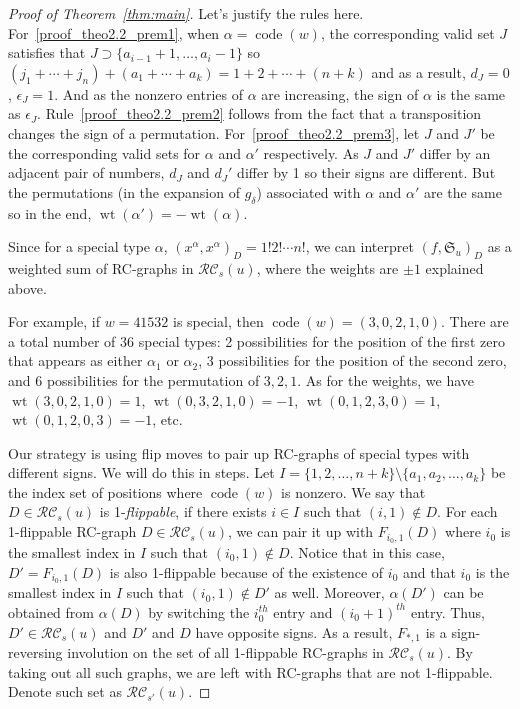 \documentclass[ALCO,ThmDefs,Unicode,epreuves]{cedram}
\newcommand{\RC}{\mathcal{RC}}
\DeclareMathOperator{\wt}{wt}
\DeclareMathOperator{\code}{code}
\begin{document}
\begin{proof}[Proof of Theorem~\ref{thm:main}]
Let's justify the rules here. For~\eqref{proof_theo2.2_prem1}, when $\alpha=\code(w)$, the corresponding valid set $J$ satisfies that $J\supset\{a_{i-1}+1,\ldots,a_i-1\}$ so $(j_1+\cdots+j_n)+(a_1+\cdots+a_k)=1+2+\cdots+(n+k)$ and as a result, $d_J=0$, $\epsilon_J=1$. And as the nonzero entries of $\alpha$ are increasing, the sign of $\alpha$ is the same as $\epsilon_J$. Rule~\eqref{proof_theo2.2_prem2} follows from the fact that a transposition changes the sign of a permutation. For~\eqref{proof_theo2.2_prem3}, let $J$ and $J'$ be the corresponding valid sets for $\alpha$ and $\alpha'$ respectively. As $J$ and $J'$ differ by an adjacent pair of numbers, $d_J$ and $d_J'$ differ by 1 so their signs are different. But the permutations (in the expansion of $g_{\delta}$) associated with $\alpha$ and $\alpha'$ are the same so in the end, $\wt(\alpha')=-\wt(\alpha)$.

Since for a special type $\alpha$, $(x^{\alpha},x^{\alpha})_D=1!2!\cdots n!$, we can interpret $(f,\mathfrak{S}_u)_D$ as a weighted sum of RC-graphs in $\RC_s(u)$, where the weights are $\pm1$ explained above.

For example, if $w=41532$ is special, then $\code(w)=(3,0,2,1,0)$. There are a total number of 36 special types: 2 possibilities for the position of the first zero that appears as either $\alpha_1$ or $\alpha_2$, 3 possibilities for the position of the second zero, and 6 possibilities for the permutation of $3,2,1$. As for the weights, we have $\wt(3,0,2,1,0)=1$, $\wt(0,3,2,1,0)=-1$, $\wt(0,1,2,3,0)=1$, $\wt(0,1,2,0,3)=-1$, etc. 

Our strategy is using flip moves to pair up RC-graphs of special types with different signs. We will do this in steps. Let $I=\{1,2,\ldots,n+k\}\setminus\{a_1,a_2,\ldots,a_k\}$ be the index set of positions where $\code(w)$ is nonzero. We say that $D\in\RC_s(u)$ is 1-\emph{flippable}, if there exists $i\in I$ such that $(i,1)\notin D$. For each 1-flippable RC-graph $D\in\RC_s(u)$, we can pair it up with $F_{i_0,1}(D)$ where $i_0$ is the smallest index in $I$ such that $(i_0,1)\notin D$. Notice that in this case, $D'=F_{i_0,1}(D)$ is also 1-flippable because of the existence of $i_0$ and that $i_0$ is the smallest index in $I$ such that $(i_0,1)\notin D'$ as well. Moreover, $\alpha(D')$ can be obtained from $\alpha(D)$ by switching the $i_0^{th}$ entry and $(i_0+1)^{th}$ entry. Thus, $D'\in\RC_s(u)$ and $D'$ and $D$ have opposite signs. As a result, $F_{*,1}$ is a sign-reversing involution on the set of all 1-flippable RC-graphs in $\RC_s(u)$. By taking out all such graphs, we are left with RC-graphs that are not 1-flippable. Denote such set as $\RC_{s'}(u)$. 


\end{proof}
\end{document}

